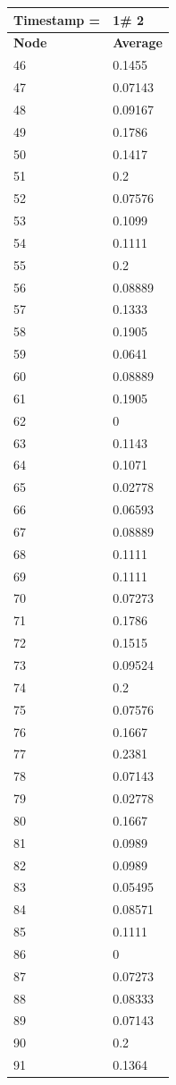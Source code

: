\begin{tabular}{|l||l|}
\hline
\textbf{Timestamp =} & \textbf{1}\# 2\\\hline
	\textbf{Node} & \textbf{Average} \\ \hline
\hline
	46 & 0.1455 \\ \hline
	47 & 0.07143 \\ \hline
	48 & 0.09167 \\ \hline
	49 & 0.1786 \\ \hline
	50 & 0.1417 \\ \hline
	51 & 0.2 \\ \hline
	52 & 0.07576 \\ \hline
	53 & 0.1099 \\ \hline
	54 & 0.1111 \\ \hline
	55 & 0.2 \\ \hline
	56 & 0.08889 \\ \hline
	57 & 0.1333 \\ \hline
	58 & 0.1905 \\ \hline
	59 & 0.0641 \\ \hline
	60 & 0.08889 \\ \hline
	61 & 0.1905 \\ \hline
	62 & 0 \\ \hline
	63 & 0.1143 \\ \hline
	64 & 0.1071 \\ \hline
	65 & 0.02778 \\ \hline
	66 & 0.06593 \\ \hline
	67 & 0.08889 \\ \hline
	68 & 0.1111 \\ \hline
	69 & 0.1111 \\ \hline
	70 & 0.07273 \\ \hline
	71 & 0.1786 \\ \hline
	72 & 0.1515 \\ \hline
	73 & 0.09524 \\ \hline
	74 & 0.2 \\ \hline
	75 & 0.07576 \\ \hline
	76 & 0.1667 \\ \hline
	77 & 0.2381 \\ \hline
	78 & 0.07143 \\ \hline
	79 & 0.02778 \\ \hline
	80 & 0.1667 \\ \hline
	81 & 0.0989 \\ \hline
	82 & 0.0989 \\ \hline
	83 & 0.05495 \\ \hline
	84 & 0.08571 \\ \hline
	85 & 0.1111 \\ \hline
	86 & 0 \\ \hline
	87 & 0.07273 \\ \hline
	88 & 0.08333 \\ \hline
	89 & 0.07143 \\ \hline
	90 & 0.2 \\ \hline
	91 & 0.1364 \\ \hline
\end{tabular}
